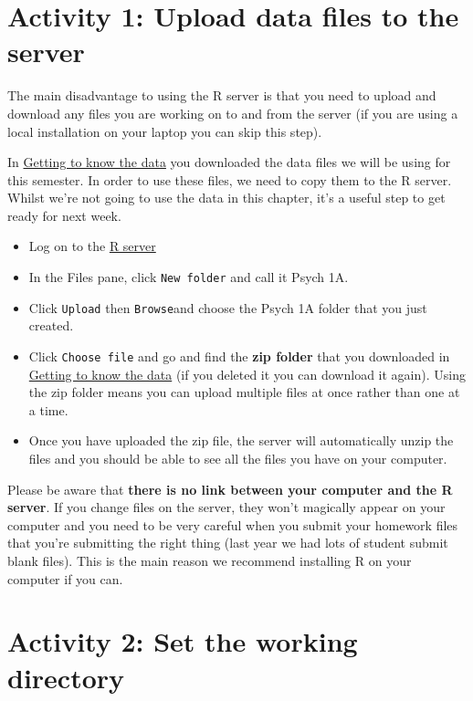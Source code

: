 \documentclass[
  oneside]{book}
\providecommand{\tightlist}{%
  \setlength{\itemsep}{0pt}\setlength{\parskip}{0pt}}
\begin{document}
\hypertarget{activity-1-upload-data-files-to-the-server}{%
\section{Activity 1: Upload data files to the server}\label{activity-1-upload-data-files-to-the-server}}

The main disadvantage to using the R server is that you need to upload and download any files you are working on to and from the server (if you are using a local installation on your laptop you can skip this step).

In \href{https://psyteachr.github.io/ug1-practical/getting-to-know-the-data.html\#activity-2}{Getting to know the data} you downloaded the data files we will be using for this semester. In order to use these files, we need to copy them to the R server. Whilst we're not going to use the data in this chapter, it's a useful step to get ready for next week.

\begin{itemize}
\tightlist
\item
  Log on to the \href{https://rstudio.psy.gla.ac.uk/}{R server}
\item
  In the Files pane, click \texttt{New\ folder} and call it Psych 1A.
\item
  Click \texttt{Upload} then \texttt{Browse}and choose the Psych 1A folder that you just created.
\item
  Click \texttt{Choose\ file} and go and find the \textbf{zip folder} that you downloaded in \href{https://psyteachr.github.io/ug1-practical/getting-to-know-the-data.html\#activity-2}{Getting to know the data} (if you deleted it you can download it again). Using the zip folder means you can upload multiple files at once rather than one at a time.
\item
  Once you have uploaded the zip file, the server will automatically unzip the files and you should be able to see all the files you have on your computer.
\end{itemize}

Please be aware that \textbf{there is no link between your computer and the R server}. If you change files on the server, they won't magically appear on your computer and you need to be very careful when you submit your homework files that you're submitting the right thing (last year we had lots of student submit blank files). This is the main reason we recommend installing R on your computer if you can.

\hypertarget{activity-2-set-the-working-directory}{%
\section{Activity 2: Set the working directory}\label{activity-2-set-the-working-directory}}
\end{document}
